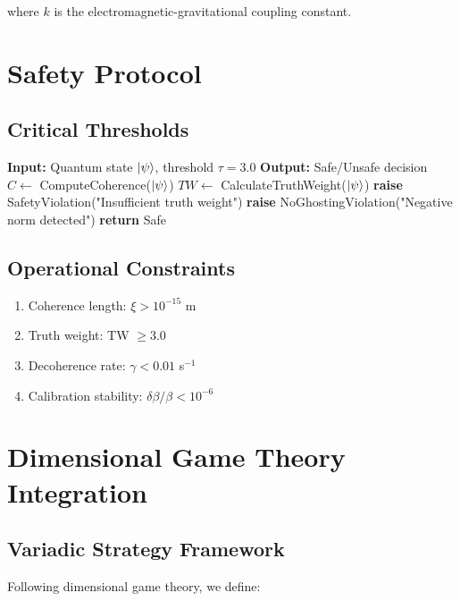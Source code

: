\documentclass{article}
\begin{document}
where $k$ is the electromagnetic-gravitational coupling constant.

\section{Safety Protocol}

\subsection{Critical Thresholds}

\begin{algorithm}
\caption{Safety Verification Protocol}
\begin{algorithmic}
\STATE \textbf{Input:} Quantum state $\ket{\psi}$, threshold $\tau = 3.0$
\STATE \textbf{Output:} Safe/Unsafe decision
\STATE
\STATE $C \leftarrow$ ComputeCoherence($\ket{\psi}$)
\STATE $TW \leftarrow$ CalculateTruthWeight($\ket{\psi}$)
\STATE
{}
    \STATE \textbf{raise} SafetyViolation("Insufficient truth weight")
\ENDIF
{}
    \STATE \textbf{raise} NoGhostingViolation("Negative norm detected")
\ENDIF
\STATE \textbf{return} Safe
\end{algorithmic}
\end{algorithm}

\subsection{Operational Constraints}

\begin{enumerate}
    \item Coherence length: $\xi > 10^{-15}$ m
    \item Truth weight: TW $\geq 3.0$
    \item Decoherence rate: $\gamma < 0.01$ s$^{-1}$
    \item Calibration stability: $\delta\beta/\beta < 10^{-6}$
\end{enumerate}

\section{Dimensional Game Theory Integration}

\subsection{Variadic Strategy Framework}

Following dimensional game theory, we define:
\end{document}
